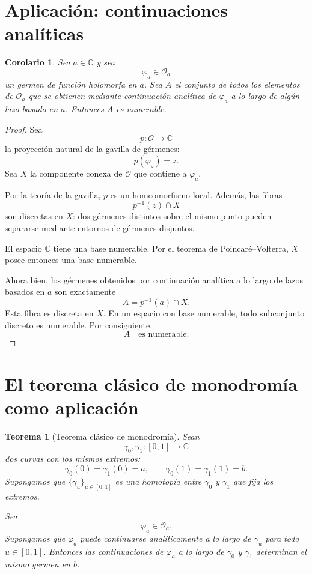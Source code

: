 \documentclass[11pt,a4paper]{article}
\theoremstyle{definition}
\theoremstyle{plain}
\newtheorem{teorema}{Teorema}[section]
\newtheorem{corolario}{Corolario}[section]
\theoremstyle{remark}
\newcommand{\C}{\mathbb C}
\newcommand{\I}{[0,1]}
\begin{document}
\section{Aplicación: continuaciones analíticas}

\begin{corolario}
Sea $a\in\C$ y sea
\[
\varphi_a\in\mathcal O_a
\]
un germen de función holomorfa en $a$. Sea $A$ el conjunto de todos
los elementos de $\mathcal O_a$ que se obtienen mediante continuación
analítica de $\varphi_a$ a lo largo de algún lazo basado en $a$.
Entonces $A$ es numerable.
\end{corolario}

\begin{proof}
Sea
\[
p:\mathcal O\longrightarrow\C
\]
la proyección natural de la gavilla de gérmenes:
\[
p(\varphi_z)=z.
\]
Sea $X$ la componente conexa de $\mathcal O$ que contiene a
$\varphi_a$.

Por la teoría de la gavilla, $p$ es un homeomorfismo local. Además,
las fibras
\[
p^{-1}(z)\cap X
\]
son discretas en $X$: dos gérmenes distintos sobre el mismo punto
pueden separarse mediante entornos de gérmenes disjuntos.

El espacio $\C$ tiene una base numerable. Por el teorema de
Poincaré--Volterra, $X$ posee entonces una base numerable.

Ahora bien, los gérmenes obtenidos por continuación analítica a lo
largo de lazos basados en $a$ son exactamente
\[
A=p^{-1}(a)\cap X.
\]
Esta fibra es discreta en $X$. En un espacio con base numerable, todo
subconjunto discreto es numerable. Por consiguiente,
\[
A\quad\text{es numerable}.
\]
\end{proof}

\section{El teorema clásico de monodromía como aplicación}

\begin{teorema}[Teorema clásico de monodromía]
Sean
\[
\gamma_0,\gamma_1:\I\longrightarrow\C
\]
dos curvas con los mismos extremos:
\[
\gamma_0(0)=\gamma_1(0)=a,
\qquad
\gamma_0(1)=\gamma_1(1)=b.
\]
Supongamos que $\{\gamma_u\}_{u\in\I}$ es una homotopía entre
$\gamma_0$ y $\gamma_1$ que fija los extremos.

Sea
\[
\varphi_a\in\mathcal O_a.
\]
Supongamos que $\varphi_a$ puede continuarse analíticamente a lo largo
de $\gamma_u$ para todo $u\in\I$. Entonces las continuaciones de
$\varphi_a$ a lo largo de $\gamma_0$ y $\gamma_1$ determinan el mismo
germen en $b$.
\end{teorema}
\end{document}
